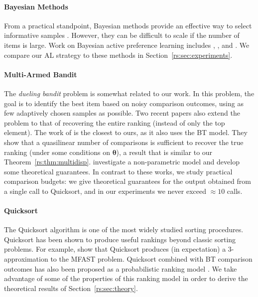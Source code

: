 \paragraph{Bayesian Methods}
From a practical standpoint, Bayesian methods provide an effective way to select informative samples \citep{mackay1992bayesian}.
However, they can be difficult to scale if the number of items is large.
Work on Bayesian active preference learning includes
\citet{chu2005extensions}, \citet{houlsby2012collaborative}, \citet{salimans2012collaborative} and \citet{chen2013pairwise}.
We compare our AL strategy to these methods in Section~\ref{rs:sec:experiments}.

\paragraph{Multi-Armed Bandit}
The \emph{dueling bandit} problem \citep{yue2009karmed} is somewhat related to our work.
In this problem, the goal is to identify the best item based on noisy comparison outcomes, using as few adaptively chosen samples as possible.
Two recent papers also extend the problem to that of recovering the entire ranking (instead of only the top element).
The work of \citet{szorenyi2015online} is the closest to ours, as it also uses the BT model.
They show that a quasilinear number of comparisons is sufficient to recover the true ranking (under some conditions on $\bm{\theta}$), a result that is similar to our Theorem~\ref{rs:thm:multidisp}.
\citet{heckel2016active} investigate a non-parametric model and develop some theoretical guarantees.
In contrast to these works, we study practical comparison budgets: we give theoretical guarantees for the output obtained from a single call to Quicksort, and in our experiments we never exceed $\approx 10$ calls.

\paragraph{Quicksort}
The Quicksort algorithm \citep{hoare1962quicksort} is one of the most widely studied sorting procedures.
Quicksort has been shown to produce useful rankings beyond classic sorting problems.
For example, \citet{ailon2008aggregating} show that Quicksort produces (in expectation) a $3$-approximation to the MFAST problem.
Quicksort combined with BT comparison outcomes has also been proposed as a probabilistic ranking model \citep{ailon2008reconciling}.
We take advantage of some of the properties of this ranking model in order to derive the theoretical results of Section~\ref{rs:sec:theory}.
